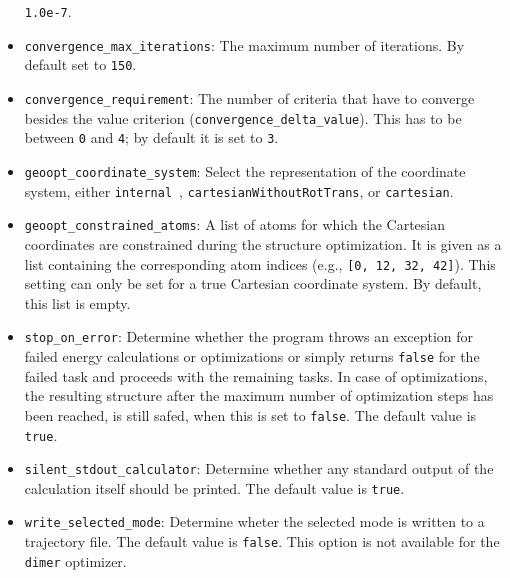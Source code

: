 \documentclass[]{tufte-book}
\begin{document}
\begin{itemize}
\texttt{1.0e-7}.
\item \texttt{convergence\_max\_iterations}: The maximum number of iterations. By default set to \texttt{150}.
\item \texttt{convergence\_requirement}: The number of criteria that have to converge besides the value criterion
(\texttt{convergence\_delta\_value}). This has to be between \texttt{0} and \texttt{4}; by default it is set to \texttt{3}.
\item \texttt{geoopt\_coordinate\_system}: Select the representation of the coordinate system, either \texttt{internal}~\cite{libirc}, \texttt{cartesianWithoutRotTrans}, or \texttt{cartesian}.
\item \texttt{geoopt\_constrained\_atoms}: A list of atoms for which the Cartesian coordinates are constrained during the structure optimization.
  It is given as a list containing the corresponding atom indices (e.g., \texttt{[0, 12, 32, 42]}). This setting can only be set for a true Cartesian coordinate system.
By default, this list is empty.
\item \texttt{stop\_on\_error}: Determine whether the program throws an exception for failed energy calculations or optimizations or simply returns \texttt{false} for the failed task and proceeds with the remaining tasks. In case of optimizations, the resulting structure after the maximum number of optimization steps has been reached, is still safed, when this is set to \texttt{false}. The default value is \texttt{true}.
\item \texttt{silent\_stdout\_calculator}: Determine whether any standard output of the calculation itself should be printed. The default value is \texttt{true}.
\item \texttt{write\_selected\_mode}: Determine wheter the selected mode is written to a trajectory file. The default value is \texttt{false}. This option is not available for the \texttt{dimer} optimizer.
\end{itemize}
\end{document}
